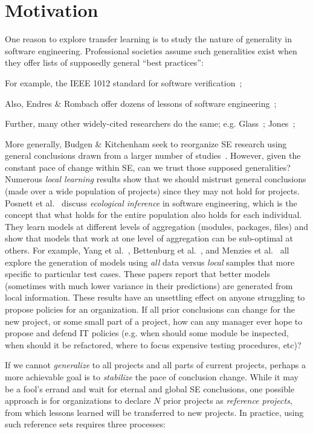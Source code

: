 \section{Motivation}
\label{sec:Motivation}

One reason to explore transfer learning
is to study the nature of
generality in software engineering.  Professional
societies assume such generalities exist when they
offer lists of supposedly general ``best practices'':
\squishlist
\item For example, the  IEEE 1012 standard for software
  verification~\cite{1012};
\item
  Also, Endres \& Rombach offer
dozens of lessons of software
engineering~\cite{endres03};
\item Further, many other
widely-cited researchers do the same; e.g.
Glass~\cite{glass02}; Jones~\cite{jones10};
\item
  More generally, Budgen \& Kitchenham seek to
reorganize SE research using general conclusions
drawn from a larger number of
studies~\cite{budgen06,budgen09}.
\squishend
However,
given the constant pace of change within SE, can we trust
those supposed generalities? 
Numerous {\em local learning} results show that we
should mistrust general conclusions (made over a
wide population of projects) since they may not hold
for projects.  Posnett et al.~\cite{posnett11}
discuss {\em ecological inference} in software
engineering, which is the concept that what holds
for the entire population also holds for each
individual.  They learn models at different levels
of aggregation (modules, packages, files) and show
that models that work at one level of aggregation
can be sub-optimal at others.  For example, Yang et
al.~\cite{yang11}, Bettenburg et
al.~\cite{betten14}, and Menzies et al.~\cite{me12d}
all explore the generation of models using {\em all}
data versus {\em local} samples that more specific
to particular test cases. These papers report that
better models (sometimes with much lower variance in
their predictions) are generated from local
information.
These results have an unsettling effect on anyone
struggling to propose policies for an organization.
If all prior conclusions can change for the new
project, or some small part of a project, how can
any manager ever hope to propose and defend IT
policies (e.g. when should some module be inspected,
when should it be refactored, where to focus
expensive testing procedures, etc)?

If we cannot {\em generalize} to all projects and all parts
of current projects, perhaps a more achievable goal is to {\em stabilize} the pace of conclusion change. 
While it may be 
a fool's errand  and wait for  eternal and global SE
conclusions, one possible approach is for organizations
to declare $N$ prior projects as {\em reference projects},
from which lessons learned will be transferred to new projects.
In practice, using such reference sets requires three processes:
\squishlist

